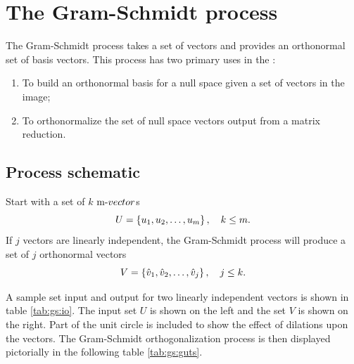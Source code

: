 \chapter{The Gram-Schmidt process}
\label{sec:gs}

The Gram-Schmidt process takes a set of vectors and provides an orthonormal set of basis vectors. This process has two primary uses in the \svdp:
\begin{enumerate}
\item To build an orthonormal basis for a null space given a set of vectors in the image;
\item To orthonormalize the set of null space vectors output from a matrix reduction.
\end{enumerate}

\section{Process schematic}
Start with a set of $k$ $\mv$s
\begin{equation}
  U = \left\{ u_{1},u_{2},\dots,u_{m} \right\}, \quad k\le m.
\end{equation}
If $j$ vectors are linearly independent, the Gram-Schmidt process will produce a set of $j$ orthonormal vectors
\begin{equation}
  V = \left\{ \hat{v}_{1},\hat{v}_{2},\dots,\hat{v}_{j} \right\}, \quad j\le k.
\end{equation}

A sample set input and output for two linearly independent vectors is shown in table \eqref{tab:gs:io}. The input set $U$ is shown on the left and the set $V$ is shown on the right. Part of the unit circle is included to show the effect of dilations upon the vectors. The Gram-Schmidt orthogonalization process is then displayed pictorially in the following table \eqref{tab:gs:guts}.


